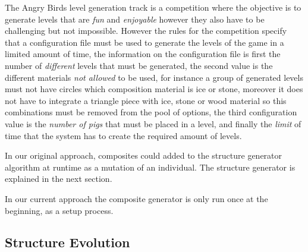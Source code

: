 \documentclass[conference]{IEEEtran}
\begin{document}
    The Angry Birds level generation track is a competition where the objective is 
    to generate levels that are \textit{fun} and \textit{enjoyable} however they 
    also have to be challenging but not impossible. However the rules for the competition 
    specify that a configuration file must be used to
    generate the levels of the game in a limited amount of time, the information on
    the configuration file is first the number of \textit{different} levels
    that must be generated, the second value is the different materials \textit{not
    allowed} to be used, for instance a group of generated levels must not have
    circles which composition material is ice or stone, moreover it does not have to
    integrate a triangle piece with ice, stone or wood material so this combinations
    must be removed from the pool of options, the third configuration value is the
    \textit{number of pigs} that must be placed in a level, and finally the
    \textit{limit} of time that the system has to create the required amount of
    levels.
    
    
    In our original approach, composites could added to the structure generator
    algorithm at runtime as a mutation of an individual. The structure generator
    is explained in the next section.

    
    In our current approach the composite generator is only
    run once at the beginning, as a setup process.
    

    \subsection{Structure Evolution}
\end{document}
